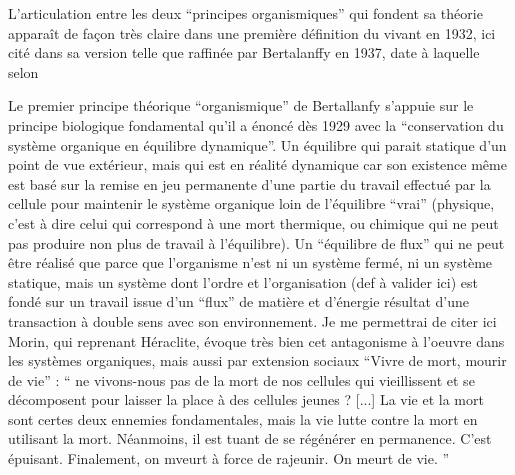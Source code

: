 
L'articulation entre les deux \enquote{principes organismiques} qui fondent sa théorie apparaît de façon très claire dans une première définition du vivant en 1932, ici cité dans sa version telle que raffinée par Bertalanffy en 1937, date à laquelle selon 	


Le premier principe théorique \enquote{organismique} de Bertallanfy s'appuie sur le principe biologique fondamental qu'il a énoncé dès 1929 avec la \enquote{conservation du système organique en équilibre dynamique}. Un équilibre qui parait statique d'un point de vue extérieur, mais qui est en réalité dynamique car son existence même est basé sur la remise en jeu permanente d'une partie du travail effectué par la cellule pour maintenir le système organique loin de l'équilibre \enquote{vrai} (physique, c'est à dire celui qui correspond à une mort thermique, ou chimique qui ne peut pas produire non plus de travail à l'équilibre). Un \enquote{équilibre de flux} qui ne peut être réalisé que parce que l'organisme n'est ni un système fermé, ni un système statique, mais un système dont l'ordre et l'organisation (def à valider ici) est fondé sur un travail issue d'un \enquote{flux} de matière et d'énergie résultat d'une transaction à double sens avec son environnement. \autocite[472]{Pouvreau2013} Je me permettrai de citer ici Morin, qui reprenant Héraclite, évoque très bien cet antagonisme à l'oeuvre dans les systèmes organiques, mais aussi par extension sociaux \enquote{Vivre de mort, mourir de vie} : \enquote{ ne vivons-nous pas de la mort de nos cellules qui vieillissent et se décomposent pour laisser la place à des cellules jeunes ? [...] La vie et la mort sont certes deux ennemies fondamentales, mais la vie lutte contre la mort en utilisant la mort. Néanmoins, il est tuant de se régénérer en permanence. C’est épuisant. Finalement, on mveurt à force de rajeunir. On meurt de vie. } \autocite{MorinXX} 

